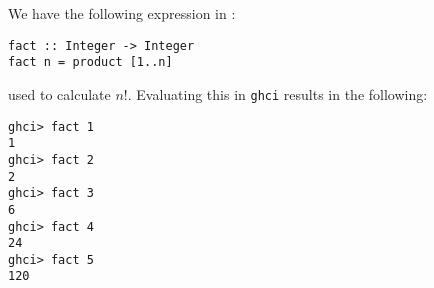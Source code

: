 
We have the following expression in :
\scriptsize\begin{verbatim}
fact :: Integer -> Integer
fact n = product [1..n]
\end{verbatim}\normalsize
used to calculate $n!$. Evaluating this in \verb|ghci| results in the 
following:
\scriptsize\begin{verbatim}
ghci> fact 1
1
ghci> fact 2
2
ghci> fact 3
6
ghci> fact 4
24
ghci> fact 5
120
\end{verbatim}\normalsize
